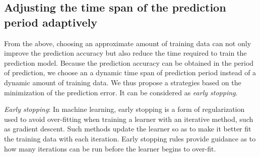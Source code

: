 




\subsection{Adjusting the time span of the prediction period adaptively \textit{\textbf{\large}}}
\label{measure_study}
From the above, choosing an approximate amount of training data can not only improve the prediction accuracy but also reduce the time required to train the prediction model. Because the prediction accuracy can be obtained in the period of prediction, we choose an a dynamic time span of prediction period instead of a dynamic amount of training data. We thus propose a strategies based on the minimization of the prediction error. It can be considered as \emph{early stopping}.


\emph{Early stopping}: In machine learning, early stopping is a form of regularization used to avoid over-fitting when training a learner with an iterative method, such as gradient descent. Such methods update the learner so as to make it better fit the training data with each iteration. Early stopping rules provide guidance as to how many iterations can be run before the learner begins to over-fit.


